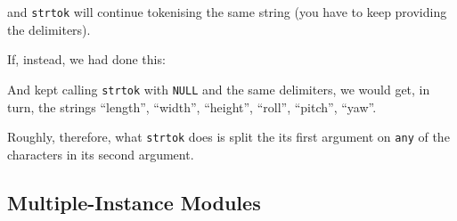\documentclass[a4paper,10pt]{article}
\newcommand{\kw}[1]{\texttt{#1}}
\begin{document}
and \kw{strtok} will continue tokenising the same string (you have to
keep providing the delimiters).

If, instead, we had done this:


And kept calling \kw{strtok} with \kw{NULL} and the same delimiters,
we would get, in turn, the strings ``length'', ``width'', ``height'',
``roll'', ``pitch'', ``yaw''.

Roughly, therefore, what \kw{strtok} does is split the its first
argument on \kw{any} of the characters in its second argument.

\subsection{Multiple-Instance Modules}
\end{document}

